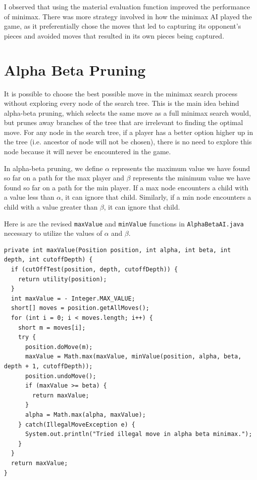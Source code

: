 \documentclass{article}
\begin{document}
I observed that using the material evaluation function improved the performance of minimax. There was more strategy involved in how the minimax AI played the game, as it preferentially chose the moves that led to capturing its opponent's pieces and avoided moves that resulted in its own pieces being captured.

\section{Alpha Beta Pruning}

It is possible to choose the best possible move in the minimax search process without exploring every node of the search tree. This is the main idea behind alpha-beta pruning, which selects the same move as a full minimax search would, but prunes away branches of the tree that are irrelevant to finding the optimal move. For any node in the search tree, if a player has a better option higher up in the tree (i.e. ancestor of node will not be chosen), there is no need to explore this node because it will never be encountered in the game.

In alpha-beta pruning, we define $\alpha$ represents the maximum value we have found so far on a path for the max player and $\beta$ represents the minimum value we have found so far on a path for the min player. If a max node encounters a child with a value less than $\alpha$, it can ignore that child. Similarly, if a min node encounters a child with a value greater than $\beta$, it can ignore that child.

Here is are the revised \verb`maxValue` and \verb`minValue` functions in \verb`AlphaBetaAI.java` necessary to utilize the values of $\alpha$ and $\beta$.

\begin{lstlisting}
private int maxValue(Position position, int alpha, int beta, int depth, int cutoffDepth) {
  if (cutOffTest(position, depth, cutoffDepth)) {
    return utility(position);
  }
  int maxValue = - Integer.MAX_VALUE;
  short[] moves = position.getAllMoves();
  for (int i = 0; i < moves.length; i++) {
    short m = moves[i];
    try {
      position.doMove(m);
      maxValue = Math.max(maxValue, minValue(position, alpha, beta, depth + 1, cutoffDepth));
      position.undoMove();
      if (maxValue >= beta) {
        return maxValue;
      }
      alpha = Math.max(alpha, maxValue);
    } catch(IllegalMoveException e) {
      System.out.println("Tried illegal move in alpha beta minimax.");
    }
  }
  return maxValue;
}
\end{lstlisting}
\end{document}
